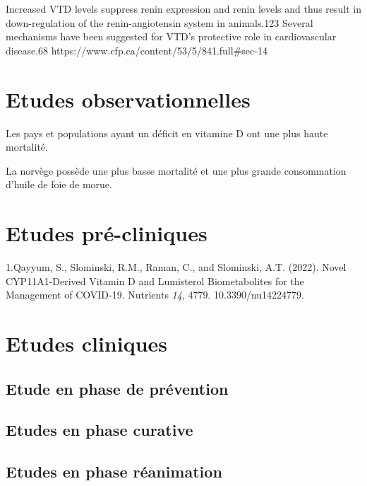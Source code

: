 \documentclass[
  a4paper,
  DIV=11,
  numbers=noendperiod,
  listof=totoc]{scrreprt}
\begin{document}
Increased VTD levels suppress renin expression and renin levels and thus
result in down-regulation of the renin-angiotensin system in animals.123
Several mechanisms have been suggested for VTD's protective role in
cardiovascular disease.68
https://www.cfp.ca/content/53/5/841.full\#sec-14

\textcite{Bishop.2021}

\hypertarget{etudes-observationnelles}{%
\section{Etudes observationnelles}\label{etudes-observationnelles}}

\textcite{Bishop.2021}

Les pays et populations ayant un déficit en vitamine D ont une plus
haute mortalité.

La norvège possède une plus basse mortalité et une plus grande
consommation d'huile de foie de morue.

\hypertarget{etudes-pruxe9-cliniques}{%
\section{Etudes pré-cliniques}\label{etudes-pruxe9-cliniques}}

1.Qayyum, S., Slominski, R.M., Raman, C., and Slominski, A.T. (2022).
Novel CYP11A1-Derived Vitamin D and Lumisterol Biometabolites for the
Management of COVID-19. Nutrients \emph{14}, 4779. 10.3390/nu14224779.

\hypertarget{etudes-cliniques}{%
\section{Etudes cliniques}\label{etudes-cliniques}}

\hypertarget{etude-en-phase-de-pruxe9vention}{%
\subsection{Etude en phase de
prévention}\label{etude-en-phase-de-pruxe9vention}}

\hypertarget{etudes-en-phase-curative}{%
\subsection{Etudes en phase curative}\label{etudes-en-phase-curative}}

\hypertarget{etudes-en-phase-ruxe9animation}{%
\subsection{Etudes en phase
réanimation}\label{etudes-en-phase-ruxe9animation}}
\end{document}
